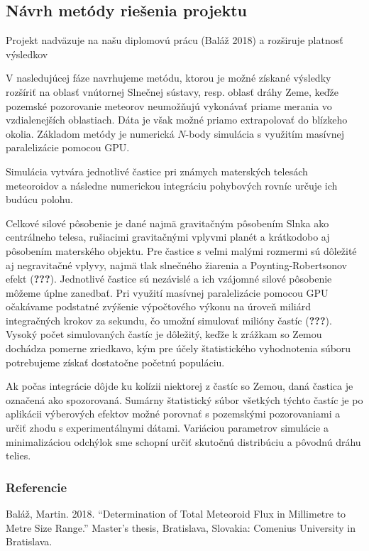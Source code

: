 \subsection{Návrh metódy riešenia
projektu}\label{nuxe1vrh-metuxf3dy-rieux161enia-projektu}

Projekt nadväzuje na našu diplomovú prácu (Baláž 2018) a rozširuje
platnosť výsledkov

V nasledujúcej fáze navrhujeme metódu, ktorou je možné získané výsledky
rozšíriť na oblasť vnútornej Slnečnej sústavy, resp. oblasť dráhy Zeme,
keďže pozemské pozorovanie meteorov neumožňujú vykonávať priame merania
vo vzdialenejších oblastiach. Dáta je však možné priamo extrapolovať do
blízkeho okolia. Základom metódy je numerická \(N\)-body simulácia s
využitím masívnej paralelizácie pomocou GPU.

Simulácia vytvára jednotlivé častice pri známych materských telesách
meteoroidov a následne numerickou integráciu pohybových rovníc určuje
ich budúcu polohu.

Celkové silové pôsobenie je dané najmä gravitačným pôsobením Slnka ako
centrálneho telesa, rušiacimi gravitačnými vplyvmi planét a krátkodobo
aj pôsobením materského objektu. Pre častice s veľmi malými rozmermi sú
dôležité aj negravitačné vplyvy, najmä tlak slnečného žiarenia a
Poynting-Robertsonov efekt ({\textbf{???}}). Jednotlivé častice sú
nezávislé a ich vzájomné silové pôsobenie môžeme úplne zanedbať. Pri
využití masívnej paralelizácie pomocou GPU očakávame podstatné zvýšenie
výpočtového výkonu na úroveň miliárd integračných krokov za sekundu, čo
umožní simulovať milióny častíc ({\textbf{???}}). Vysoký počet
simulovaných častíc je dôležitý, keďže k zrážkam so Zemou dochádza
pomerne zriedkavo, kým pre účely štatistického vyhodnotenia súboru
potrebujeme získať dostatočne početnú populáciu.

Ak počas integrácie dôjde ku kolízii niektorej z častíc so Zemou, daná
častica je označená ako spozorovaná. Sumárny štatistický súbor všetkých
týchto častíc je po aplikácii výberových efektov možné porovnať s
pozemskými pozorovaniami a určiť zhodu s experimentálnymi dátami.
Variáciou parametrov simulácie a minimalizáciou odchýlok sme schopní
určiť skutočnú distribúciu a pôvodnú dráhu telies.

\subsubsection*{Referencie}\label{referencie}

\hypertarget{refs}{}
\hypertarget{ref-balaz2018}{}
Baláž, Martin. 2018. ``Determination of Total Meteoroid Flux in
Millimetre to Metre Size Range.'' Master's thesis, Bratislava, Slovakia:
Comenius University in Bratislava.
